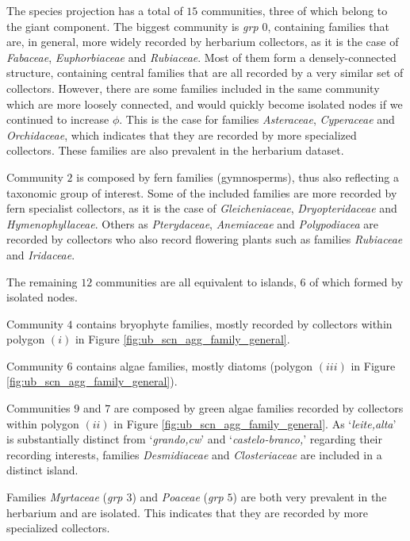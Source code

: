 The species projection has a total of $15$ communities, three of which belong to the giant component. 
The biggest community is \textit{grp $0$}, containing families that are, in general, more widely recorded by herbarium collectors, as it is the case of \textit{Fabaceae}, \textit{Euphorbiaceae} and \textit{Rubiaceae}.
Most of them form a densely-connected structure, containing central families that are all recorded by a very similar set of collectors.
However, there are some families included in the same community which are more loosely connected, and would quickly become isolated nodes if we continued to increase $\phi$. 
This is the case for families \textit{Asteraceae}, \textit{Cyperaceae} and \textit{Orchidaceae}, which indicates that they are recorded by more specialized collectors.
These families are also prevalent in the herbarium dataset.

Community $2$ is composed by fern families (gymnosperms), thus also reflecting a taxonomic group of interest.
Some of the included families are more recorded by fern specialist collectors, as it is the case of \textit{Gleicheniaceae}, \textit{Dryopteridaceae} and \textit{Hymenophyllaceae}.
Others as \textit{Pterydaceae}, \textit{Anemiaceae} and \textit{Polypodiacea} are recorded by collectors who also record flowering plants such as families \textit{Rubiaceae} and \textit{Iridaceae}.


The remaining $12$ communities are all equivalent to islands, $6$ of which formed by isolated nodes.

Community $4$ contains bryophyte families, mostly recorded by collectors within polygon $(i)$ in Figure \ref{fig:ub_scn_agg_family_general}.

Community $6$ contains algae families, mostly diatoms (polygon $(iii)$ in Figure \ref{fig:ub_scn_agg_family_general}).

Communities $9$ and $7$ are composed by green algae families recorded by collectors within polygon $(ii)$ in Figure \ref{fig:ub_scn_agg_family_general}.
As `\textit{leite,alta}' is substantially distinct from `\textit{grando,cw}' and `\textit{castelo-branco,}' regarding their recording interests, families \textit{Desmidiaceae} and \textit{Closteriaceae} are included in a distinct island.

Families \textit{Myrtaceae} (\textit{grp $3$}) and \textit{Poaceae} (\textit{grp $5$}) are both very prevalent in the herbarium and are isolated.
This indicates that they are recorded by more specialized collectors.





